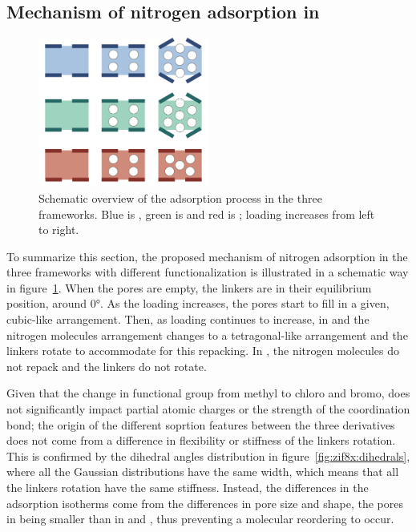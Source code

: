 \documentclass[thesis]{subfiles}
\begin{document}
\subsection{Mechanism of nitrogen adsorption in }

\begin{figure}[ht]
    \centering
    \includegraphics[width=0.5\textwidth]{figures/images/zif8x-summary}
    \caption{Schematic overview of the adsorption process in the three 
    frameworks. Blue is , green is \ZIFCl and red is \ZIFBr; loading
    increases from left to right.}
    \label{fig:zif8x:summary}
\end{figure}

To summarize this section, the proposed mechanism of nitrogen adsorption in the
three  frameworks with different functionalization is illustrated in a
schematic way in figure~\ref{fig:zif8x:summary}. When the pores are empty, the
linkers are in their equilibrium position, around 0°. As the loading increases,
the pores start to fill in a given, cubic-like arrangement. Then, as loading
continues to increase, in  and \ZIFCl the nitrogen molecules arrangement
changes to a tetragonal-like arrangement and the linkers rotate to accommodate
for this repacking. In \ZIFBr, the nitrogen molecules do not repack and the
linkers do not rotate.

Given that the change in functional group from methyl to chloro and bromo, does
not significantly impact partial atomic charges or the strength of the 
coordination bond; the origin of the different soprtion features between the
three  derivatives does not come from a difference in flexibility or
stiffness of the linkers rotation. This is confirmed by the dihedral angles
distribution in figure~\ref{fig:zif8x:dihedrals}, where all the Gaussian
distributions have the same width, which means that all the linkers rotation
have the same stiffness. Instead, the differences in the adsorption isotherms
come from the differences in pore size and shape, the pores in \ZIFBr being
smaller than in \ZIFCl and , thus preventing a molecular reordering to
occur.
\end{document}
